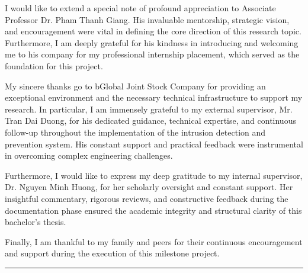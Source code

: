 \documentclass[14pt, a4paper, oneside]{report}
\begin{document}
I would like to extend a special note of profound appreciation to Associate Professor Dr. Pham Thanh Giang. His invaluable mentorship, strategic vision, and encouragement were vital in defining the core direction of this research topic. Furthermore, I am deeply grateful for his kindness in introducing and welcoming me to his company for my professional internship placement, which served as the foundation for this project.

My sincere thanks go to bGlobal Joint Stock Company for providing an exceptional environment and the necessary technical infrastructure to support my research. In particular, I am immensely grateful to my external supervisor, Mr. Tran Dai Duong, for his dedicated guidance, technical expertise, and continuous follow-up throughout the implementation of the intrusion detection and prevention system. His constant support and practical feedback were instrumental in overcoming complex engineering challenges.

Furthermore, I would like to express my deep gratitude to my internal supervisor, Dr. Nguyen Minh Huong, for her scholarly oversight and constant support. Her insightful commentary, rigorous reviews, and constructive feedback during the documentation phase ensured the academic integrity and structural clarity of this bachelor's thesis.

Finally, I am thankful to my family and peers for their continuous encouragement and support during the execution of this milestone project.
\clearpage


\clearpage


{}
\thispagestyle{plain} %
\par\nobreak %
\vspace{0.1cm}%
{\color{chapcolor}\noindent\rule{\textwidth}{1pt}}\par\nobreak
\vspace{1.0cm}%
\end{document}
